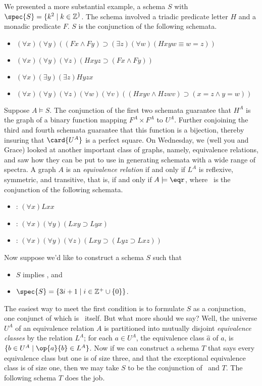 We presented a more substantial example, a schema $S$ with $\spec{S}=\{k^2\mid k\in \mathbb{Z}^\}$. The schema involved a triadic predicate letter $H$ and a monadic predicate $F$. $S$ is the conjunction of the following schemata.
\begin{itemize}
\item $(\forall x)(\forall y)((Fx\wedge Fy)\supset(\exists z)(\forall w)(Hxyw\equiv w=z))$
\item $(\forall x)(\forall y)(\forall z)(Hxyz\supset (Fx\wedge Fy))$
\item $(\forall x)(\exists y)(\exists z)Hyzx$
\item $(\forall x)(\forall y)(\forall z)(\forall w)(\forall v)((Hxyv\wedge Hzwv)\supset (x=z\wedge y=w))$
\end{itemize}
Suppose $A\models S$. The conjunction of the first two schemata guarantee that $H^A$ is the graph of a binary function mapping $F^A\times F^A$ to $U^A$. Further conjoining the third and fourth schemata guarantee that this function is a bijection, thereby insuring that $\card{U^A}$ is a perfect square.
\iffalse 
On Wednesday, we (well you and Grace) looked at another important class of graphs, namely, equivalence relations, and saw how they can be put to use in generating schemata with a wide range of spectra. A graph $A$ is an \emph{equivalence relation} if and only if $L^A$ is reflexive, symmetric, and transitive, that is, if and only if $A\models\eqr$, where \eqr\ is the conjunction of the following schemata.
\begin{itemize}
\item
{}: $(\forall x)Lxx$
\item
\sym: $(\forall x)(\forall y)(Lxy\supset Lyx)$
\item
\trans: $(\forall x)(\forall y)(\forall z)(Lxy\supset(Lyz\supset Lxz))$
\end{itemize}
Now suppose we'd like to construct a schema $S$ such that
\begin{itemize}
\item
$S$ implies \eqr, and
\item
$\spec{S}=\{3i+1\mid i\in\mathbb{Z}^+\cup\{0\}\}$.
\end{itemize}
The easiest way to meet the first condition is to formulate $S$ as a conjunction, one conjunct of which is \eqr\ itself. But what more should we say? Well, the universe $U^A$ of an equivalence relation $A$ is partitioned into mutually disjoint \emph{equivalence classes} by the relation $L^A$; for each $a\in U^A$, the equivalence class $\hat{a}$ of $a$, is $\{b\in U^A\mid \op{a}{b}\in L^A\}$. Now if we can construct a schema $T$ that says every equivalence class but one is of size three, and that the exceptional equivalence class is of size one, then we may take $S$ to be the conjunction of \eqr\ and $T$. The following schema $T$ does the job.
